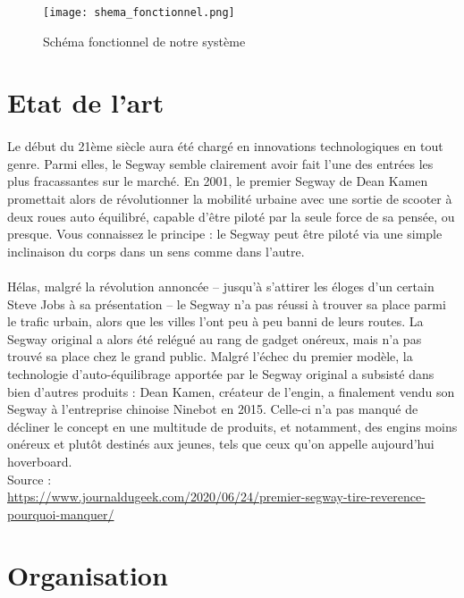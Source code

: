 \documentclass[oneside,a4paper,12pt]{article}
\begin{document}
	\begin{figure}[h]
		\centering
		\texttt{[image: shema\_fonctionnel.png]}
		\caption{Schéma fonctionnel de notre système}
	\end{figure}

	\section{Etat de l'art}
	\paragraph{}
	Le début du 21ème siècle aura été chargé en innovations technologiques en tout genre. Parmi elles, le Segway semble clairement avoir fait l’une des entrées les plus fracassantes sur le marché. En 2001, le premier Segway de Dean Kamen promettait alors de révolutionner la mobilité urbaine avec une sortie de scooter à deux roues auto équilibré, capable d’être piloté par la seule force de sa pensée, ou presque. Vous connaissez le principe : le Segway peut être piloté via une simple inclinaison du corps dans un sens comme dans l’autre.
	\paragraph{}
	Hélas, malgré la révolution annoncée – jusqu’à s’attirer les éloges d’un certain Steve Jobs à sa présentation – le Segway n’a pas réussi à trouver sa place parmi le trafic urbain, alors que les villes l’ont peu à peu banni de leurs routes. La Segway original a alors été relégué au rang de gadget onéreux, mais n’a pas trouvé sa place chez le grand public. Malgré l’échec du premier modèle, la technologie d’auto-équilibrage apportée par le Segway original a subsisté dans bien d’autres produits : Dean Kamen, créateur de l’engin, a finalement vendu son Segway à l’entreprise chinoise Ninebot en 2015. Celle-ci n’a pas manqué de décliner le concept en une multitude de produits, et notamment, des engins moins onéreux et plutôt destinés aux jeunes, tels que ceux qu’on appelle aujourd’hui hoverboard.\\




	\sloppy
	Source :\\ \url{https://www.journaldugeek.com/2020/06/24/premier-segway-tire-reverence-pourquoi-manquer/}
	
	\newpage
	
	\section{Organisation}
	
\end{document}
